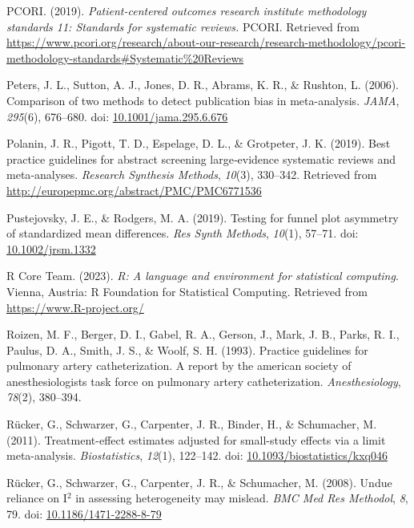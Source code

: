 \documentclass[
  letterpaper,
  DIV=11,
  numbers=noendperiod]{scrreprt}
\newlength{\cslhangindent}
\newlength{\cslentryspacingunit} %
\newenvironment{CSLReferences}[2] %
 {%
  \setlength{\parindent}{0pt}
  \ifodd #1
  \let\oldpar\par
  \def\par{\hangindent=\cslhangindent\oldpar}
  \fi
  \setlength{\parskip}{#2\cslentryspacingunit}
 }%
 {}
\begin{document}
\begin{CSLReferences}{1}{0}
\leavevmode{}%
PCORI. (2019). \emph{Patient-centered outcomes research institute
methodology standards 11: Standards for systematic reviews.} {PCORI}.
Retrieved from
\url{https://www.pcori.org/research/about-our-research/research-methodology/pcori-methodology-standards\#Systematic\%20Reviews}

\leavevmode{}%
Peters, J. L., Sutton, A. J., Jones, D. R., Abrams, K. R., \& Rushton,
L. (2006). Comparison of two methods to detect publication bias in
meta-analysis. \emph{JAMA}, \emph{295}(6), 676--680. doi:
\href{https://doi.org/10.1001/jama.295.6.676}{10.1001/jama.295.6.676}

\leavevmode{}%
Polanin, J. R., Pigott, T. D., Espelage, D. L., \& Grotpeter, J. K.
(2019). Best practice guidelines for abstract screening large‐evidence
systematic reviews and meta‐analyses. \emph{Research Synthesis Methods},
\emph{10}(3), 330--342. Retrieved from
\url{http://europepmc.org/abstract/PMC/PMC6771536}

\leavevmode{}%
Pustejovsky, J. E., \& Rodgers, M. A. (2019). Testing for funnel plot
asymmetry of standardized mean differences. \emph{Res Synth Methods},
\emph{10}(1), 57--71. doi:
\href{https://doi.org/10.1002/jrsm.1332}{10.1002/jrsm.1332}

\leavevmode{}%
R Core Team. (2023). \emph{R: A language and environment for statistical
computing}. Vienna, Austria: R Foundation for Statistical Computing.
Retrieved from \url{https://www.R-project.org/}

\leavevmode{}%
Roizen, M. F., Berger, D. I., Gabel, R. A., Gerson, J., Mark, J. B.,
Parks, R. I., Paulus, D. A., Smith, J. S., \& Woolf, S. H. (1993).
Practice guidelines for pulmonary artery catheterization. A report by
the american society of anesthesiologists task force on pulmonary artery
catheterization. \emph{Anesthesiology}, \emph{78}(2), 380--394.

\leavevmode{}%
Rücker, G., Schwarzer, G., Carpenter, J. R., Binder, H., \& Schumacher,
M. (2011). Treatment-effect estimates adjusted for small-study effects
via a limit meta-analysis. \emph{Biostatistics}, \emph{12}(1), 122--142.
doi:
\href{https://doi.org/10.1093/biostatistics/kxq046}{10.1093/biostatistics/kxq046}

\leavevmode{}%
Rücker, G., Schwarzer, G., Carpenter, J. R., \& Schumacher, M. (2008).
Undue reliance on {I}\(^2\) in assessing heterogeneity may mislead.
\emph{BMC Med Res Methodol}, \emph{8}, 79. doi:
\href{https://doi.org/10.1186/1471-2288-8-79}{10.1186/1471-2288-8-79}


\end{CSLReferences}
\end{document}

